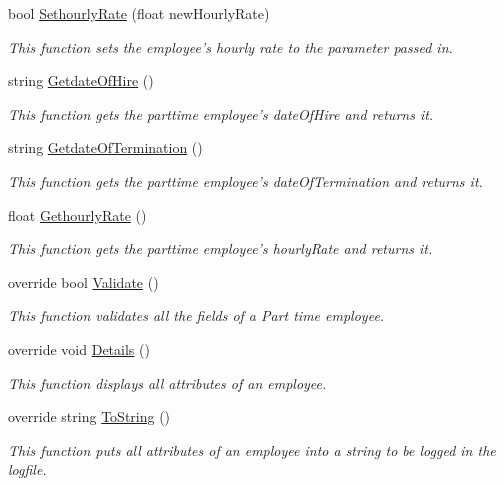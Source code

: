 \begin{DoxyCompactItemize}
bool \hyperlink{class_all_employees_1_1_parttime_employee_a678ae1d0680315c2dba77c96931aa19b}{Sethourly\-Rate} (float new\-Hourly\-Rate)
\begin{DoxyCompactList}\small\item\em This function sets the employee's hourly rate to the parameter passed in. \end{DoxyCompactList}\item 
string \hyperlink{class_all_employees_1_1_parttime_employee_a3184e786409338080748667ace17f3dc}{Getdate\-Of\-Hire} ()
\begin{DoxyCompactList}\small\item\em This function gets the parttime employee's date\-Of\-Hire and returns it. \end{DoxyCompactList}\item 
string \hyperlink{class_all_employees_1_1_parttime_employee_ae12f4b918aa34cc1e79aa1ed5ea952dd}{Getdate\-Of\-Termination} ()
\begin{DoxyCompactList}\small\item\em This function gets the parttime employee's date\-Of\-Termination and returns it. \end{DoxyCompactList}\item 
float \hyperlink{class_all_employees_1_1_parttime_employee_ac4bf9a61e24fb884c813cac6ca0c6713}{Gethourly\-Rate} ()
\begin{DoxyCompactList}\small\item\em This function gets the parttime employee's hourly\-Rate and returns it. \end{DoxyCompactList}\item 
override bool \hyperlink{class_all_employees_1_1_parttime_employee_aa60112b979df41dc7d51b3f0886da473}{Validate} ()
\begin{DoxyCompactList}\small\item\em This function validates all the fields of a Part time employee. \end{DoxyCompactList}\item 
override void \hyperlink{class_all_employees_1_1_parttime_employee_aaf16c1c44f9c5d78f971c5d3f17ee6b1}{Details} ()
\begin{DoxyCompactList}\small\item\em This function displays all attributes of an employee. \end{DoxyCompactList}\item 
override string \hyperlink{class_all_employees_1_1_parttime_employee_ab24493d33b967822f501bd92996a9e21}{To\-String} ()
\begin{DoxyCompactList}\small\item\em This function puts all attributes of an employee into a string to be logged in the logfile. \end{DoxyCompactList}\end{DoxyCompactItemize}
